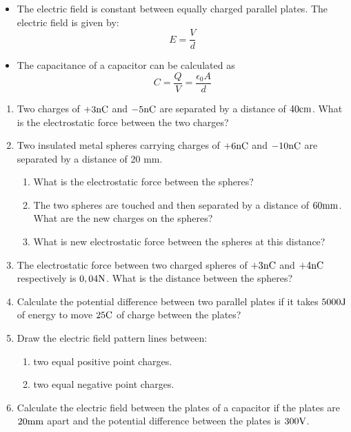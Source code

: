 \begin{itemize}
\item The electric field is constant between equally charged parallel
plates. The electric field is given by:
\begin{equation*}
E = \frac{V}{d}
\end{equation*}

\item The capacitance of a capacitor can be calculated as
\begin{equation*}
C = \frac{Q}{V} = \frac{\epsilon _{0}A}{d}
\end{equation*}
\end{itemize}

\begin{eocexercises}{}
\begin{enumerate}

\item Two charges of $+3{\rm nC}$ and $-5{\rm nC}$ are separated by a distance of $40 {\rm cm}$. What is the electrostatic force between the two charges?
\item {Two insulated metal spheres carrying charges of  $+6{\rm nC}$ and $-10{\rm nC}$ are separated by a distance of 20 mm.
\begin {enumerate}
\item {What is the electrostatic force between the spheres?}
\item {The two spheres are touched and then separated by a distance of $60 {\rm mm}$. What are the new charges on the spheres?}
\item {What is new electrostatic force between the spheres at this distance?}
\end {enumerate}}
\item The electrostatic force between two charged spheres of $+3{\rm nC}$ and $+4{\rm nC}$ respectively is $0,04 {\rm N}$. What is the distance between the spheres?
\item Calculate the potential difference between two parallel plates if it takes $5000 {\rm J}$ of energy to move $25 {\rm C}$ of charge between the plates?
\item {Draw the electric field pattern lines between:
\begin {enumerate}
\item {two equal positive point charges.}
\item {two equal negative point charges.}
\end {enumerate}}
\item Calculate the electric field between the plates of a capacitor if the plates are $20 {\rm mm}$ apart and the potential difference between the plates is $300 {\rm V}$.

\end{enumerate}
\end{eocexercises}
